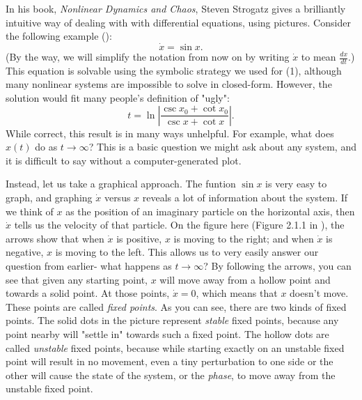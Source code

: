 \documentclass[man, 12pt]{apa6}
\newcommand{\citep}[1]{(\cite{#1})}
\begin{document}

In his book, \textit{Nonlinear Dynamics and Chaos}, Steven Strogatz gives a brilliantly intuitive way of dealing with with differential equations, using pictures. Consider the following example \citep{strogatz_1994}:
\begin{equation}
\dot{x}=\sin x.
\end{equation}
(By the way, we will simplify the notation from now on by writing $\dot{x}$ to mean $\frac{dx}{dt}$.) This equation is solvable using the symbolic strategy we used for (1), although many nonlinear systems are impossible to solve in closed-form. However, the solution would fit many people's definition of "ugly":
\begin{equation}
t=\ln\left|\frac{\csc x_0 + \cot x_0}{\csc x + \cot x}\right|.
\end{equation}
While correct, this result is in many ways unhelpful. For example, what does $x(t)$ do as $t\to\infty$? This is a basic question we might ask about any system, and it is difficult to say without a computer-generated plot.

Instead, let us take a graphical approach. The funtion $\sin x$ is very easy to graph, and graphing $\dot{x}$ versus $x$ reveals a lot of information about the system. If we think of $x$ as the position of an imaginary particle on the horizontal axis, then $\dot{x}$ tells us the velocity of that particle. 
On the figure here (Figure 2.1.1 in \cite{strogatz_1994}), the arrows show that when $\dot{x}$ is positive, $x$ is moving to the right; and when $\dot{x}$ is negative, $x$ is moving to the left. This allows us to very easily answer our question from earlier- what happens as $t\to\infty$? By following the arrows, you can see that given any starting point, $x$ will move away from a hollow point and towards a solid point. At those points, $\dot{x}=0$, which means that $x$ doesn't move. These points are called \emph{fixed points}. As you can see, there are two kinds of fixed points. The solid dots in the picture represent \emph{stable} fixed points, because any point nearby will "settle in" towards such a fixed point. The hollow dots are called \emph{unstable} fixed points, because while starting exactly on an unstable fixed point will result in no movement, even a tiny perturbation to one side or the other will cause the state of the system, or the \emph{phase}, to move away from the unstable fixed point. 
\end{document}
